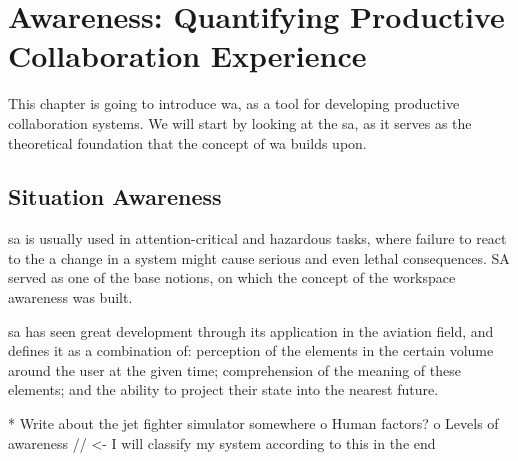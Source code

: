 
\chapter{Awareness: Quantifying Productive Collaboration Experience}

This chapter is going to introduce \gls{wa}, as a tool for developing productive collaboration systems. We will start by looking at the \gls{sa}, as it serves as the theoretical foundation that the concept of \gls{wa} builds upon.

\section{Situation Awareness}

\gls{sa} is usually used in attention-critical and hazardous tasks, where failure to react to the a change in a system might cause serious and even lethal consequences. SA served as one of the base notions, on which the concept of the workspace awareness was built.

\gls{sa} has seen great development through its application in the aviation field, and \cite{endsley_situation_1988} defines it as a combination of: perception of the elements in the certain volume around the user at the given time; comprehension of the meaning of these elements; and the ability to project their state into the nearest future.


* Write about the jet fighter simulator somewhere
o Human factors?
o Levels of awareness // <- I will classify my system according to this in the end

